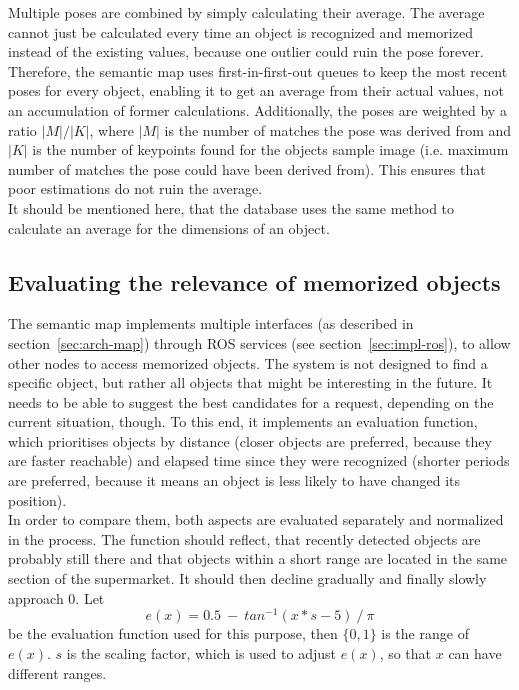 Multiple poses are combined by simply calculating their average. The average cannot just be calculated every time an object is recognized and memorized instead of the existing values, because one outlier could ruin the pose forever. Therefore, the semantic map uses first-in-first-out queues to keep the most recent poses for every object, enabling it to get an average from their actual values, not an accumulation of former calculations. Additionally, the poses are weighted by a ratio $|M|/|K|$, where $|M|$ is the number of matches the pose was derived from and $|K|$ is the number of keypoints found for the objects sample image (i.e. maximum number of matches the pose could have been derived from). This ensures that poor estimations do not ruin the average. \\

It should be mentioned here, that the database uses the same method to calculate an average for the dimensions of an object.

\subsection{Evaluating the relevance of memorized objects}
\label{sec:impl-eval}
The semantic map implements multiple interfaces (as described in section~\ref{sec:arch-map}) through ROS services (see section~\ref{sec:impl-ros}), to allow other nodes to access memorized objects. The system is not designed to find a specific object, but rather all objects that might be interesting in the future. It needs to be able to suggest the best candidates for a request, depending on the current situation, though. To this end, it implements an evaluation function, which prioritises objects by distance (closer objects are preferred, because they are faster reachable) and elapsed time since they were recognized (shorter periods are preferred, because it means an object is less likely to have changed its position). \\

In order to compare them, both aspects are evaluated separately and normalized in the process. The function should reflect, that recently detected objects are probably still there and that objects within a short range are located in the same section of the supermarket. It should then decline gradually and finally slowly approach $0$. Let
\begin{equation*}
  e(x) = 0.5\ -\ tan^{-1}(x * s -5)\ /\ \pi
\end{equation*}
be the evaluation function used for this purpose, then $\{0, 1\}$ is the range of $e(x)$. $s$ is the scaling factor, which is used to adjust $e(x)$, so that $x$ can have different ranges.

